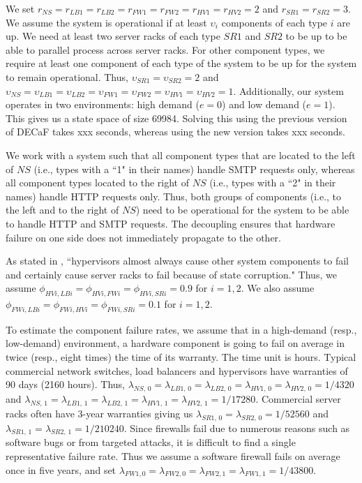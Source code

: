 \documentclass[12pt]{article}
\begin{document}
We set $r_{NS} = r_{LB1} = r_{LB2} = r_{FW1} = r_{FW2} = r_{HV1} = r_{HV2} =
2$ and $r_{SR1} = r_{SR2} = 3$. We assume the system is operational if at
least $\upsilon_i$ components of each type $i$ are up. We need at least two
server racks of each type $SR1$ and $SR2$ to be up to be able to parallel
process across server racks. For other component types, we require at least
one component of each type of the system to be up for the system to remain
operational. Thus, $\upsilon_{SR1} = \upsilon_{SR2} = 2$ and $\upsilon_{NS} =
\upsilon_{LB1} = \upsilon_{LB2} = \upsilon_{FW1} = \upsilon_{FW2} =
\upsilon_{HV1} = \upsilon_{HV2} = 1$. Additionally, our system operates in two
environments: high demand ($e = 0$) and low demand ($e = 1$). This gives us a
state space of size 69984. Solving this using the previous version of DECaF
takes xxx seconds, whereas using the new version takes xxx seconds.

We work with a system such that all component types that are located to the
left of $NS$ (i.e., types with a ``1" in their names) handle SMTP requests
only, whereas all component types located to the right of $NS$ (i.e., types
with a ``2" in their names) handle HTTP requests only. Thus, both groups of
components (i.e., to the left and to the right of $NS$) need to be operational
for the system to be able to handle HTTP and SMTP requests. The decoupling
ensures that hardware failure on one side does not immediately propagate to
the other.

As stated in \cite{ReHype:2011}, ``hypervisors almost always cause other
system components to fail and certainly cause server racks to fail because of
state corruption." Thus, we assume $\phi_{HVi,LBi} = \phi_{HVi,FWi} =
\phi_{HVi,SRi} = 0.9$ for $i = 1, 2$. We also assume $\phi_{FWi,LBi} = 
\phi_{FWi,HVi} = \phi_{FWi,SRi} = 0.1$ for $i = 1, 2$.

To estimate the component failure rates, we assume that in a high-demand
(resp., low-demand) environment, a hardware component is going to fail
on average in twice (resp., eight times) the time of its warranty. The time unit
is hours. Typical commercial network switches, load balancers and hypervisors
have warranties of 90 days (2160 hours). Thus, $\lambda_{NS, \, 0} =
\lambda_{LB1, \, 0} = \lambda_{LB2, \, 0} = \lambda_{HV1, \, 0} =
\lambda_{HV2, \, 0} = 1 / 4320$ and $\lambda_{NS, \, 1} = \lambda_{LB1, \, 1}
= \lambda_{LB2, \, 1} = \lambda_{HV1, \, 1} = \lambda_{HV2, \, 1} = 1 /
17280$. Commercial server racks often have 3-year warranties giving us
$\lambda_{SR1,\, 0} = \lambda_{SR2, \, 0} = 1 / 52560$ and $\lambda_{SR1, \,
1} = \lambda_{SR2, \, 1} = 1 / 210240$. Since firewalls fail due to numerous
reasons such as software bugs or from targeted attacks, it is difficult to
find a single representative failure rate. Thus we assume a software firewall
fails on average once in five years, and set $\lambda_{FW1, 0} =
\lambda_{FW2, 0} = \lambda_{FW2, 1} = \lambda_{FW1, 1} = 1 / 43800$.
\end{document}
